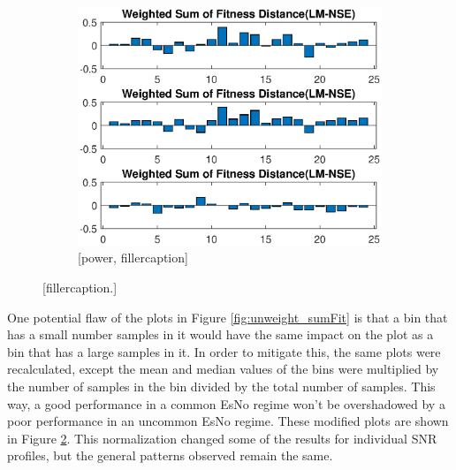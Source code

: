 \begin{figure}[ht]
\begin{center}
\begin{subfigure}{0.55\linewidth}
	\centering
	\includegraphics[scale=0.6]{figures/c_sim_results/power_weighted_sumFitness.eps}
	\caption{[power, fillercaption]}
	\label{fig:cSimWeightPower}
\end{subfigure}
\end{center}
\caption{[fillercaption.]}
\label{fig:weight_sumFit}
\end{figure}

\par One potential flaw of the plots in Figure \ref{fig:unweight_sumFit} is that a bin that has a small number samples in it would have the same impact on the plot as a bin that has a large samples in it. In order to mitigate this, the same plots were recalculated, except the mean and median values of the bins were multiplied by the number of samples in the bin divided by the total number of samples. This way, a good performance in a common EsNo regime won't be overshadowed by a poor performance in an uncommon EsNo regime. These modified plots are shown in Figure \ref{fig:weight_sumFit}. This normalization changed some of the results for individual SNR profiles, but the general patterns observed remain the same.
